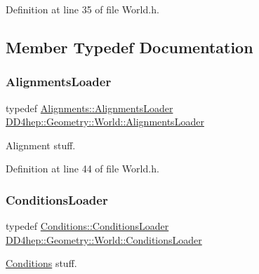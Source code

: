 Definition at line 35 of file World.\+h.



\subsection{Member Typedef Documentation}
\hypertarget{class_d_d4hep_1_1_geometry_1_1_world_a4756d57ac9e7f6d43056b07dfbfe6904}{}\label{class_d_d4hep_1_1_geometry_1_1_world_a4756d57ac9e7f6d43056b07dfbfe6904} 
\subsubsection{\texorpdfstring{Alignments\+Loader}{AlignmentsLoader}}
{\footnotesize\ttfamily typedef \hyperlink{class_d_d4hep_1_1_alignments_1_1_alignments_loader}{Alignments\+::\+Alignments\+Loader} \hyperlink{class_d_d4hep_1_1_geometry_1_1_world_a4756d57ac9e7f6d43056b07dfbfe6904}{D\+D4hep\+::\+Geometry\+::\+World\+::\+Alignments\+Loader}}



Alignment stuff. 



Definition at line 44 of file World.\+h.

\hypertarget{class_d_d4hep_1_1_geometry_1_1_world_aadddae79d9d6be44141befbbb4b7337b}{}\label{class_d_d4hep_1_1_geometry_1_1_world_aadddae79d9d6be44141befbbb4b7337b} 
\subsubsection{\texorpdfstring{Conditions\+Loader}{ConditionsLoader}}
{\footnotesize\ttfamily typedef \hyperlink{class_d_d4hep_1_1_conditions_1_1_conditions_loader}{Conditions\+::\+Conditions\+Loader} \hyperlink{class_d_d4hep_1_1_geometry_1_1_world_aadddae79d9d6be44141befbbb4b7337b}{D\+D4hep\+::\+Geometry\+::\+World\+::\+Conditions\+Loader}}



\hyperlink{namespace_d_d4hep_1_1_conditions}{Conditions} stuff. 



